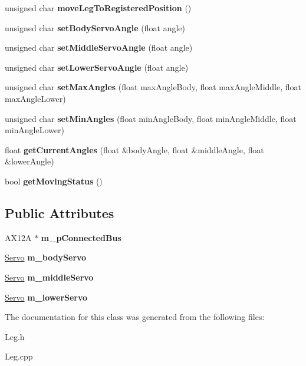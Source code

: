 \begin{DoxyCompactItemize}
\mbox{\label{class_leg_ad27fef59e6de89f7fc85f2c61bd55309}} 
unsigned char {\bfseries move\+Leg\+To\+Registered\+Position} ()
\item 
\mbox{\label{class_leg_a1cabc989ff35134313cff1c6349fa5ed}} 
unsigned char {\bfseries set\+Body\+Servo\+Angle} (float angle)
\item 
\mbox{\label{class_leg_a66cf5a6988aa5533dd22999de75494d5}} 
unsigned char {\bfseries set\+Middle\+Servo\+Angle} (float angle)
\item 
\mbox{\label{class_leg_a996c44acd7afbdaa955614535492ff2b}} 
unsigned char {\bfseries set\+Lower\+Servo\+Angle} (float angle)
\item 
\mbox{\label{class_leg_a18488274f09a797d16501670bf6ffdf6}} 
unsigned char {\bfseries set\+Max\+Angles} (float max\+Angle\+Body, float max\+Angle\+Middle, float max\+Angle\+Lower)
\item 
\mbox{\label{class_leg_a19291b1b5603d763634b9adbfed67a8a}} 
unsigned char {\bfseries set\+Min\+Angles} (float min\+Angle\+Body, float min\+Angle\+Middle, float min\+Angle\+Lower)
\item 
\mbox{\label{class_leg_a610a0f27f4bb57abe03192ae6c3579c4}} 
float {\bfseries get\+Current\+Angles} (float \&body\+Angle, float \&middle\+Angle, float \&lower\+Angle)
\item 
\mbox{\label{class_leg_a353919544c9c1766aa1903a9d39ac562}} 
bool {\bfseries get\+Moving\+Status} ()
\end{DoxyCompactItemize}
\subsection*{Public Attributes}
\begin{DoxyCompactItemize}
\item 
\mbox{\label{class_leg_ad524af2808920c519a12fbf39dd3b085}} 
A\+X12A $\ast$ {\bfseries m\+\_\+p\+Connected\+Bus}
\item 
\mbox{\label{class_leg_a2e216786fe3fd6a86abc6dd64b94e355}} 
\mbox{\hyperlink{class_servo}{Servo}} {\bfseries m\+\_\+body\+Servo}
\item 
\mbox{\label{class_leg_a76504a55bf5fa10ca4c017f4d8e40a31}} 
\mbox{\hyperlink{class_servo}{Servo}} {\bfseries m\+\_\+middle\+Servo}
\item 
\mbox{\label{class_leg_a8c384fd114b68f4e9ee1eded87d0bf8b}} 
\mbox{\hyperlink{class_servo}{Servo}} {\bfseries m\+\_\+lower\+Servo}
\end{DoxyCompactItemize}


The documentation for this class was generated from the following files\+:\begin{DoxyCompactItemize}
\item 
Leg.\+h\item 
Leg.\+cpp\end{DoxyCompactItemize}
